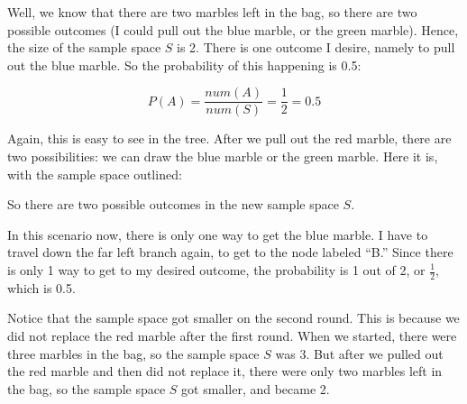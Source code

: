 \documentclass[../../../main.tex]{subfiles}
\begin{document}
Well, we know that there are two marbles left in the bag, so there are two possible outcomes (I could pull out the blue marble, or the green marble). Hence, the size of the sample space $S$ is 2. There is one outcome I desire, namely to pull out the blue marble. So the probability of this happening is 0.5:

\begin{equation*}
  P(A) = \frac{num(A)}{num(S)} = \frac{1}{2} = 0.5
\end{equation*}

\noindent
Again, this is easy to see in the tree. After we pull out the red marble, there are two possibilities: we can draw the blue marble or the green marble. Here it is, with the sample space outlined:

\begin{center}
\end{center}

\noindent
So there are two possible outcomes in the new sample space $S$.

In this scenario now, there is only one way to get the blue marble. I have to travel down the far left branch again, to get to the node labeled ``B.'' Since there is only 1 way to get to my desired outcome, the probability is 1 out of 2, or $\frac{1}{2}$, which is 0.5.

Notice that the sample space got smaller on the second round. This is because we did not replace the red marble after the first round. When we started, there were three marbles in the bag, so the sample space $S$ was 3. But after we pulled out the red marble and then did not replace it, there were only two marbles left in the bag, so the sample space $S$ got smaller, and became 2.
\end{document}

